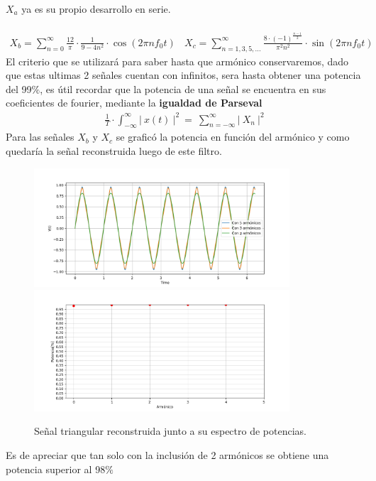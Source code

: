 $X_a$ ya es su propio desarrollo en serie.\\ \\
\begin{align}
X_b = \sum_{n=0}^{\infty} \frac{12}{\pi} \cdot \frac{1}{9-4n^2} \cdot \cos(2\pi n f_0t) \ \ \ \ 
X_c = \sum_{n=1,3,5,...}^{\infty} \frac{8 \cdot (-1)^{\frac{n-1}{2}}}{\pi^2 n^2} \cdot \sin(2\pi n f_0t)
\end{align}
El criterio que se utilizará para saber hasta que armónico conservaremos, dado que estas ultimas 2 señales cuentan con infinitos, sera hasta obtener una potencia del 99$\%$, es útil recordar que la potencia de una señal se encuentra en sus coeficientes de fourier, mediante la \textbf{igualdad de Parseval}
\begin{align}
\frac{1}{T} \cdot \int_{-\infty}^\infty |\ x(t)\ |^2 \ =\  \sum_{n=- \infty}^{\infty} |\ X_n \ |^2
\end{align}
Para las señales $X_b$ y $X_c$ se graficó la potencia en función del armónico y como quedaría la señal reconstruida  luego de este filtro.
\begin{figure}[H]
	\centering
	\includegraphics[width=0.85\textwidth]{ImagenesEjercicio2/10Armonicos.PNG}
	\includegraphics[width=0.85\textwidth]{ImagenesEjercicio2/4ARMONICOS.PNG}
\caption{Señal triangular reconstruida junto a su espectro de potencias.}
	\label{fig:pottriang}
\end{figure}
Es de apreciar que  tan solo con la inclusión de 2 armónicos se obtiene una potencia superior al 98$\%$\\
